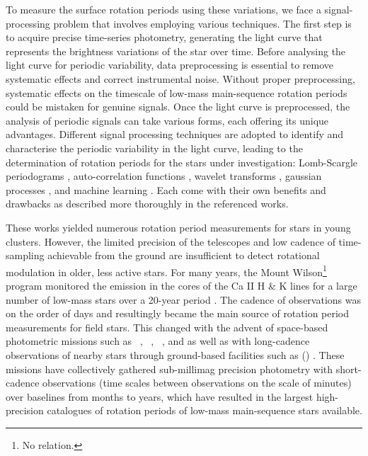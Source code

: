 To measure the surface rotation periods using these variations, we face a signal-processing problem that involves employing various techniques. 
The first step is to acquire precise time-series photometry, generating the light curve that represents the brightness variations of the star over time.
Before analysing the light curve for periodic variability, data preprocessing is essential to remove systematic effects and correct instrumental noise. 
Without proper preprocessing, systematic effects on the timescale of low-mass main-sequence rotation periods could be mistaken for genuine signals.
Once the light curve is preprocessed, the analysis of periodic signals can take various forms, each offering its unique advantages. 
Different signal processing techniques are adopted to identify and characterise the periodic variability in the light curve, leading to the determination of rotation periods for the stars under investigation: Lomb-Scargle periodograms \citep[see, e.g.,][]{lomb_least_1976, scargle_studies_1982,mottola_slow_1995,scott_photometric_1992,reinhold_fast_2013,reinhold_rotation_2013}, auto-correlation functions \citep[see, e.g.,][]{aigrain_transiting_2008,garcia_rotation_2014,mcquillan_rotation_2014}, wavelet transforms \citep[see, e.g.,][]{garcia_rotation_2014}, gaussian processes \citep[see, e.g.,][]{angus_inferring_2017}, and machine learning \citep[see, e.g.,][]{claytor_recovery_2022}.
Each come with their own benefits and drawbacks as described more thoroughly in the referenced works.

These works yielded numerous rotation period measurements for stars in young clusters.
However, the limited precision of the telescopes and low cadence of time-sampling achievable from the ground are insufficient to detect rotational modulation in older, less active stars.
For many years, the Mount Wilson\footnote{No relation.} program monitored the emission in the cores of the Ca II H \& K lines for a large number of low-mass stars over a 20-year period \citep{wilson_probable_1963}.
The cadence of observations was on the order of days and resultingly became the main source of rotation period measurements for field stars.
This changed with the advent of space-based photometric missions such as \corot \ \citep[COnvection, ROtation and planetary Transits;][]{baglin_corot_2003}, \kepler \ \citep{borucki_kepler_2010, howell_k2_2014}, \tess \ \citep[Transiting Exoplanet Survey Satellite;][]{ricker_transiting_2014}, and \gaia{} \citep{distefano_gaia_2022} as well as with long-cadence observations of nearby stars through ground-based facilities such as (\ZTF)  \citep[the Zwicky Transient Facility;][]{lu_bridging_2022}.
These missions have collectively gathered sub-millimag precision photometry with short-cadence observations (time scales between observations on the scale of minutes) over baselines from months to years, which have resulted in the largest high-precision catalogues of rotation periods of low-mass main-sequence stars available.

